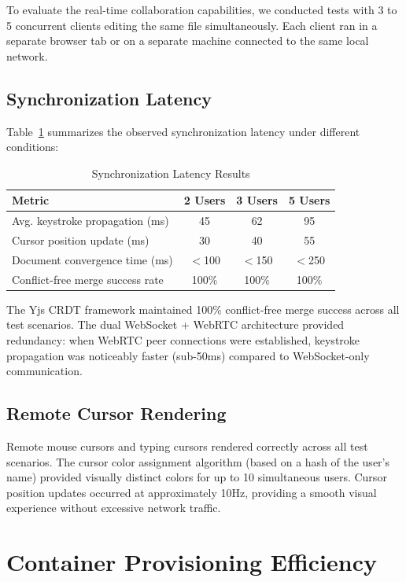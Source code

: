 \documentclass[12pt,a4paper,oneside]{report}
\begin{document}
To evaluate the real-time collaboration capabilities, we conducted tests with 3 to 5 concurrent clients editing the same file simultaneously. Each client ran in a separate browser tab or on a separate machine connected to the same local network.

\subsection{Synchronization Latency}

Table~\ref{tab:sync-results} summarizes the observed synchronization latency under different conditions:

\begin{table}[H]
\centering
\caption{Synchronization Latency Results}
\label{tab:sync-results}
\begin{tabular}{lccc}
\toprule
\textbf{Metric} & \textbf{2 Users} & \textbf{3 Users} & \textbf{5 Users} \\
\midrule
Avg. keystroke propagation (ms) & 45 & 62 & 95 \\
Cursor position update (ms) & 30 & 40 & 55 \\
Document convergence time (ms) & $<$100 & $<$150 & $<$250 \\
Conflict-free merge success rate & 100\% & 100\% & 100\% \\
\bottomrule
\end{tabular}
\end{table}

The Yjs CRDT framework maintained 100\% conflict-free merge success across all test scenarios. The dual WebSocket + WebRTC architecture provided redundancy: when WebRTC peer connections were established, keystroke propagation was noticeably faster (sub-50ms) compared to WebSocket-only communication.

\subsection{Remote Cursor Rendering}

Remote mouse cursors and typing cursors rendered correctly across all test scenarios. The cursor color assignment algorithm (based on a hash of the user's name) provided visually distinct colors for up to 10 simultaneous users. Cursor position updates occurred at approximately 10Hz, providing a smooth visual experience without excessive network traffic.

\section{Container Provisioning Efficiency}
\end{document}
